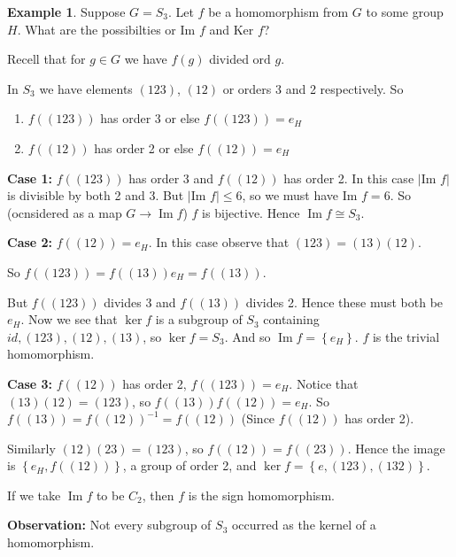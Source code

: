 \documentclass{article}
\theoremstyle{definition}
\newtheorem{exmp}{Example}[section]
\DeclareMathOperator{\Ima}{Im}
\begin{document}
\begin{exmp}
  Suppose $G=S_3$. Let $f$ be a homomorphism from $G$ to some group $H$. What are the possibilties or $\text{Im }f$ and $\text{Ker }f$?

  Recell that for $g \in G$ we have $f(g)$ divided $\text{ord }g$.

  In $S_3$ we have elements $(123)$, $(12)$ or orders 3 and 2 respectively. So
  \begin{enumerate}
    \item 
  $f\left( (123) \right)$ has order 3 or else $f\left( (123) \right)=e_H$ 
    \item 
  $f\left( (12) \right)$ has order 2 or else $f\left( (12) \right)=e_H$ 
  \end{enumerate}

  \textbf{Case 1:} $f\left( (123) \right)$ has order 3 and $f\left(  (12)\right)$ has order 2. In this case $|\text{Im }f|$ is divisible by both 2 and 3. But $|\text{Im }f| \leq 6$, so we must have $\text{Im } f=6$. So (ocnsidered as a map $G \rightarrow \Ima f$) $f$ is bijective. Hence $\Ima f \cong S_3$.

  \textbf{Case 2:} $f\left( (12) \right)=e_H$. In this case observe that $(123)=(13)(12)$.

  So $f\left( (123) \right)=f\left( (13) \right)e_H=f\left( (13) \right)$.

  But $f\left( (123) \right)$ divides 3 and $f\left( (13) \right)$ divides 2. Hence these must both be $e_H$. Now we see that $\ker f$ is a subgroup of $S_3$ containing $id, (123), (12), (13)$, so $\ker f=S_3$. And so $\Ima f = \left\{ e_H \right\}$. $f$ is the trivial homomorphism.

  \textbf{Case 3:} $f\left( (12) \right)$ has order 2, $f\left( (123) \right)=e_H$. Notice that $(13)(12)=(123)$, so $f\left( (13) \right)f\left( (12) \right)=e_H$. So $f\left( (13) \right)=f\left( (12) \right)^{-1}=f\left( (12) \right)$ (Since $f\left( (12) \right)$ has order 2).

  Similarly $(12)(23)=(123)$, so $f\left( (12) \right)=f\left( (23) \right)$. Hence the image is $\left\{ e_H,f\left( (12) \right) \right\}$, a group of order 2, and $\ker f=\left\{ e,(123),(132) \right\}$.

  If we take $\Ima f$ to be $C_2$, then $f$ is the sign homomorphism.

  \textbf{Observation:} Not every subgroup of $S_3$ occurred as the kernel of a homomorphism.
\end{exmp}
\end{document}
